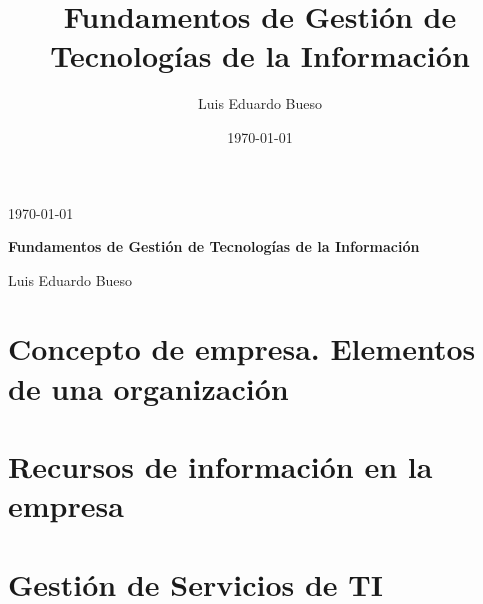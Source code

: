 \documentclass[12pt,a4paper]{report}
\title{Fundamentos de Gestión de Tecnologías de la Información}
\author{Luis Eduardo Bueso}
\date{\today}
\begin{document}
\begin{titlepage}
	\hfill \today

	\vspace{.2\textheight}

	\begin{center}
		{\huge\bfseries Fundamentos de Gestión de Tecnologías de la Información\par}
		\vspace{3cm}
                Luis Eduardo Bueso \par
	\end{center}

\end{titlepage}\tableofcontents

\chapter{Concepto de empresa. Elementos de una organización}
\label{chap:organizacion}


\chapter{Recursos de información en la empresa}
\label{chap:recursos}


\chapter{Gestión de Servicios de TI}
\label{chap:servicios}

\end{document}
